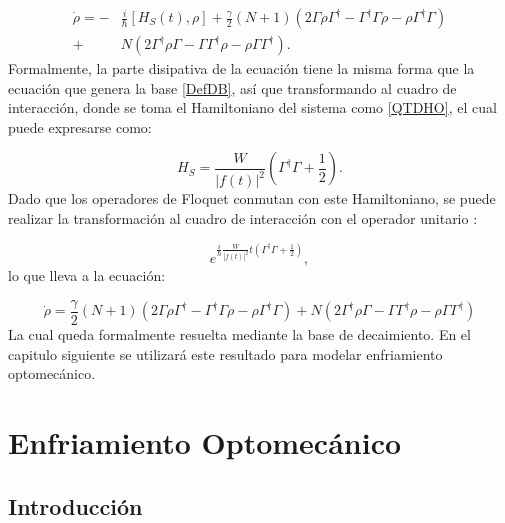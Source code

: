\documentclass[a4paper,10pt]{report}
\begin{document}
\begin{align*}
\dot{\rho} = -&\frac{i}{\hbar}[H_S (t),\rho] + \frac{\gamma}{2}(N+1)(2\Gamma\rho\Gamma^\dagger - \Gamma^\dagger\Gamma \rho - \rho \Gamma^\dagger \Gamma )\\
 +& N(2\Gamma^\dagger \rho \Gamma - \Gamma \Gamma^\dagger \rho - \rho \Gamma\Gamma^\dagger).
\end{align*} Formalmente, la parte disipativa de la ecuación tiene la misma forma que la ecuación que genera la base \ref{DefDB}, así que transformando al cuadro de interacción, donde se toma el Hamiltoniano del sistema como \ref{QTDHO}, el cual puede expresarse como\cite{BrownPT}:

\begin{equation}
H_S = \frac{W}{|f(t)|^2}(\Gamma^\dagger \Gamma + \frac{1}{2}).
\end{equation} Dado que los operadores de Floquet conmutan con este Hamiltoniano, se puede realizar la transformación al cuadro de interacción con el operador unitario \cite{SakuraiQM}:

\begin{equation}
 e^{\frac{i}{\hbar}\frac{W}{|f(t)|^2}t(\Gamma^\dagger \Gamma + \frac{1}{2})},
\end{equation}lo que lleva a la ecuación:

\begin{equation} \label{GammaLindblat}
\dot{\rho}=\frac{\gamma}{2}(N+1)(2\Gamma\rho\Gamma^\dagger - \Gamma^\dagger\Gamma \rho - \rho \Gamma^\dagger \Gamma )
 + N(2\Gamma^\dagger \rho \Gamma - \Gamma \Gamma^\dagger \rho - \rho \Gamma\Gamma^\dagger)
\end{equation}La cual queda formalmente resuelta mediante la base de decaimiento. En el capitulo siguiente se utilizará este resultado para modelar enfriamiento optomecánico.


\chapter{Enfriamiento Optomecánico}

\section{Introducción}
\end{document}
